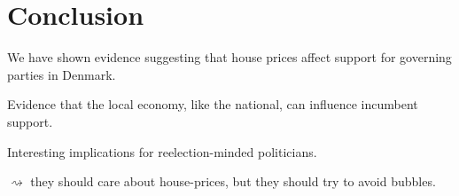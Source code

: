\documentclass[aspectratio=169]{beamer}
\begin{document}
\section{Conclusion}

	\begin{frame}
	We have shown evidence suggesting that house prices affect support for governing parties in Denmark.
		
	\vspace{0.3in} \pause
	Evidence that the local economy, like the national, can influence incumbent support.
	
	
		\vspace{0.3in} \pause
	Interesting implications for reelection-minded politicians.
	
	
	$\rightsquigarrow$ they should care about house-prices, but they should try to avoid bubbles.

\end{frame}
	
\begin{frame}
	
		
\end{frame}
\end{document}
